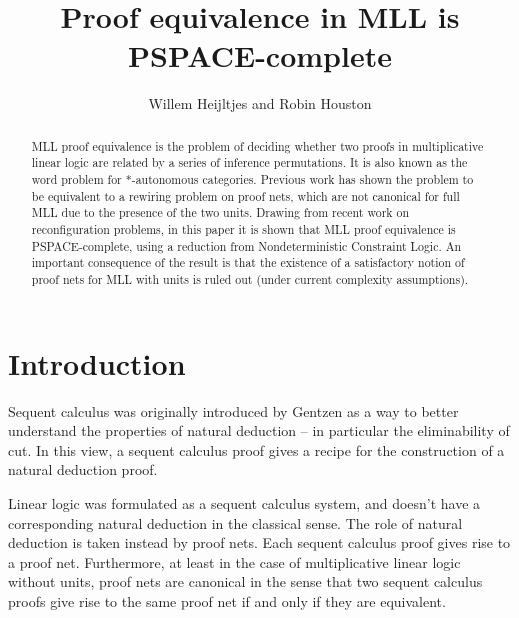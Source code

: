 \documentclass{lmcs}
\title{Proof equivalence in MLL is PSPACE-complete}
\author{Willem Heijltjes and Robin Houston}
\let\capsabbrev=\uppercase
\begin{document}



\begin{abstract}
\capsabbrev{mll} proof equivalence is the problem of deciding whether two proofs in multiplicative linear logic are related by a series of inference permutations.
%
It is also known as the word problem for $*$-autonomous categories.
%
Previous work has shown the problem to be equivalent to a rewiring problem on proof nets, which are not canonical for full \capsabbrev{mll} due to the presence of the two units.
%
Drawing from recent work on reconfiguration problems, in this paper it is shown that \capsabbrev{mll} proof equivalence is \capsabbrev{pspace}-complete, using a reduction from Nondeterministic Constraint Logic.
%
An important consequence of the result is that the existence of a satisfactory notion of proof nets for \capsabbrev{mll} with units is ruled out (under current complexity assumptions).
\end{abstract}


\maketitle



\section{Introduction}
\noindent
Sequent calculus was originally introduced by Gentzen as a way to better understand
the properties of natural deduction -- in particular the eliminability of cut. In this
view, a sequent calculus proof gives a recipe for the construction of a natural deduction
proof.

Linear logic was formulated as a sequent calculus system, and doesn’t have a corresponding
natural deduction in the classical sense. The role of natural deduction is taken instead by
proof nets. Each sequent calculus proof gives rise to a proof net. Furthermore, at least in
the case of multiplicative linear logic without units, proof nets are canonical in the sense
that two sequent calculus proofs give rise to the same proof net if and only if they are
equivalent.
\end{document}
